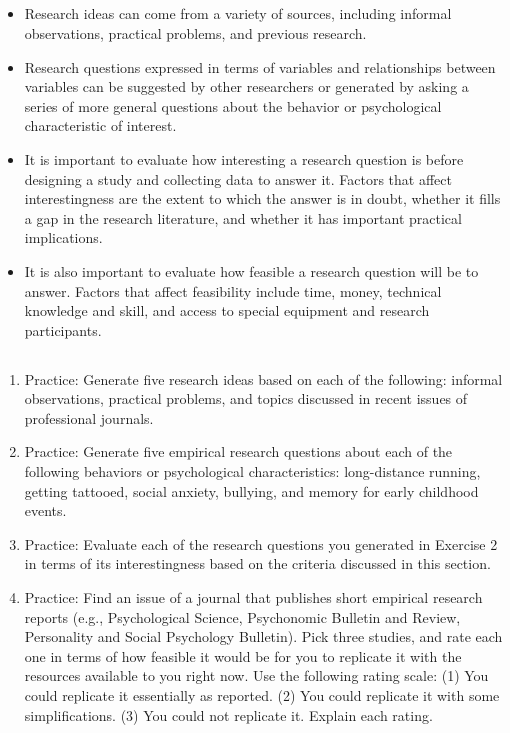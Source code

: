 \subsection{}
\begin{fullwidth}
\begin{itemize}
\item Research ideas can come from a variety of sources, including informal observations, practical problems, and previous research.
\item Research questions expressed in terms of variables and relationships between variables can be suggested by other researchers or generated by asking a series of more general questions about the behavior or psychological characteristic of interest.
\item It is important to evaluate how interesting a research question is before designing a study and collecting data to answer it. Factors that affect interestingness are the extent to which the answer is in doubt, whether it fills a gap in the research literature, and whether it has important practical implications.
\item It is also important to evaluate how feasible a research question will be to answer. Factors that affect feasibility include time, money, technical knowledge and skill, and access to special equipment and research participants.
\end{itemize}
\end{fullwidth}

\subsection{}
\begin{fullwidth}
\begin{enumerate}
\item Practice: Generate five research ideas based on each of the following: informal observations, practical problems, and topics discussed in recent issues of professional journals.
\item Practice: Generate five empirical research questions about each of the following behaviors or psychological characteristics: long-distance running, getting tattooed, social anxiety, bullying, and memory for early childhood events.
\item Practice: Evaluate each of the research questions you generated in Exercise 2 in terms of its interestingness based on the criteria discussed in this section.
\item Practice: Find an issue of a journal that publishes short empirical research reports (e.g., Psychological Science, Psychonomic Bulletin and Review, Personality and Social Psychology Bulletin). Pick three studies, and rate each one in terms of how feasible it would be for you to replicate it with the resources available to you right now. Use the following rating scale: (1) You could replicate it essentially as reported. (2) You could replicate it with some simplifications. (3) You could not replicate it. Explain each rating.
\end{enumerate}
\end{fullwidth}

